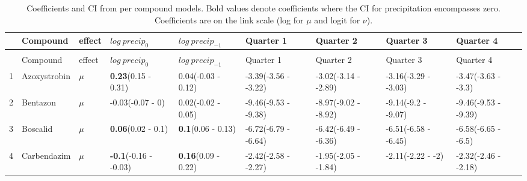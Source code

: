 \begin{landscape}
\begingroup\fontsize{8pt}{10pt}\selectfont
\begin{longtable}{lp{2cm}p{0.6cm}p{1.8cm}p{1.8cm}p{1.8cm}p{1.8cm}p{1.8cm}p{1.8cm}}
\caption[Coefficients and CI from per compound models.]{Coefficients and CI from per compound models. 
                     Bold values denote coefficients where the CI for precipitation encompasses zero.
                     Coefficients are on the link scale (log for $\mu$ and logit for $\nu$).} \\ 
  \toprule
 & Compound & effect & $log~precip_0$ & $log~precip_{-1}$ & Quarter 1 & Quarter 2 & Quarter 3 & Quarter 4 \\ 
  \midrule
  \endfirsthead
  \caption*{\raggedright Table \thetable\ Continued. }\\
  \toprule
 & Compound & effect & $log~precip_0$ & $log~precip_{-1}$ & Quarter 1 & Quarter 2 & Quarter 3 & Quarter 4 \\ 
  \midrule
  \endhead
%
1 & Azoxystrobin & $\mu$ & \textbf{0.23}\newline (0.15 - 0.31) & 0.04\newline (-0.03 - 0.12) & -3.39\newline (-3.56 - -3.22) & -3.02\newline (-3.14 - -2.89) & -3.16\newline (-3.29 - -3.03) & -3.47\newline (-3.63 - -3.3) \\ 
  2 & Bentazon & $\mu$ & -0.03\newline (-0.07 - 0) & 0.02\newline (-0.02 - 0.05) & -9.46\newline (-9.53 - -9.38) & -8.97\newline (-9.02 - -8.92) & -9.14\newline (-9.2 - -9.07) & -9.46\newline (-9.53 - -9.39) \\ 
  3 & Boscalid & $\mu$ & \textbf{0.06}\newline (0.02 - 0.1) & \textbf{0.1}\newline (0.06 - 0.13) & -6.72\newline (-6.79 - -6.64) & -6.42\newline (-6.49 - -6.36) & -6.51\newline (-6.58 - -6.45) & -6.58\newline (-6.65 - -6.5) \\ 
  4 & Carbendazim & $\mu$ & \textbf{-0.1}\newline (-0.16 - -0.03) & \textbf{0.16}\newline (0.09 - 0.22) & -2.42\newline (-2.58 - -2.27) & -1.95\newline (-2.05 - -1.84) & -2.11\newline (-2.22 - -2) & -2.32\newline (-2.46 - -2.18) \\ 

\end{longtable}
\end{landscape}
